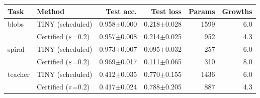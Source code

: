 \begin{tabular}{llrrrr}
\toprule
Task & Method & Test acc. & Test loss & Params & Growths \\
\midrule
blobs & TINY (scheduled) & 0.958$\pm$0.000 & 0.218$\pm$0.028 & 1599 & 6.0 \\
 & Certified ($\varepsilon$=0.2) & 0.957$\pm$0.008 & 0.214$\pm$0.025 & 952 & 4.3 \\
spiral & TINY (scheduled) & 0.973$\pm$0.007 & 0.095$\pm$0.032 & 257 & 6.0 \\
 & Certified ($\varepsilon$=0.2) & 0.969$\pm$0.017 & 0.111$\pm$0.065 & 310 & 8.0 \\
teacher & TINY (scheduled) & 0.412$\pm$0.035 & 0.770$\pm$0.155 & 1436 & 6.0 \\
 & Certified ($\varepsilon$=0.2) & 0.417$\pm$0.024 & 0.788$\pm$0.205 & 887 & 4.3 \\
\bottomrule
\end{tabular}